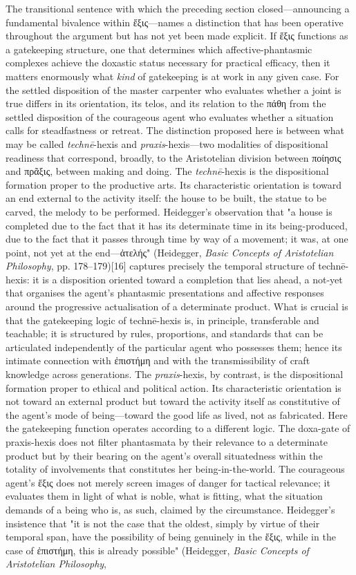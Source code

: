 \documentclass{article}
\begin{document}
The transitional sentence with which the preceding section closed—announcing a fundamental bivalence within ἕξις—names a distinction that has been operative throughout the argument but has not yet been made explicit. If ἕξις functions as a gatekeeping structure, one that determines which affective-phantasmic complexes achieve the doxastic status necessary for practical efficacy, then it matters enormously what \textit{kind} of gatekeeping is at work in any given case. For the settled disposition of the master carpenter who evaluates whether a joint is true differs in its orientation, its telos, and its relation to the πάθη from the settled disposition of the courageous agent who evaluates whether a situation calls for steadfastness or retreat. The distinction proposed here is between what may be called \textit{technē}-hexis and \textit{praxis}-hexis—two modalities of dispositional readiness that correspond, broadly, to the Aristotelian division between ποίησις and πρᾶξις, between making and doing. The \textit{technē}-hexis is the dispositional formation proper to the productive arts. Its characteristic orientation is toward an end external to the activity itself: the house to be built, the statue to be carved, the melody to be performed. Heidegger's observation that "a house is completed due to the fact that it has its determinate time in its being-produced, due to the fact that it passes through time by way of a movement; it was, at one point, not yet at the end—ἀτελής" (Heidegger, \textit{Basic Concepts of Aristotelian Philosophy}, pp. 178–179)[16] captures precisely the temporal structure of technē-hexis: it is a disposition oriented toward a completion that lies ahead, a not-yet that organises the agent's phantasmic presentations and affective responses around the progressive actualisation of a determinate product. What is crucial is that the gatekeeping logic of technē-hexis is, in principle, transferable and teachable; it is structured by rules, proportions, and standards that can be articulated independently of the particular agent who possesses them; hence its intimate connection with ἐπιστήμη and with the transmissibility of craft knowledge across generations. The \textit{praxis}-hexis, by contrast, is the dispositional formation proper to ethical and political action. Its characteristic orientation is not toward an external product but toward the activity itself as constitutive of the agent's mode of being—toward the good life as lived, not as fabricated. Here the gatekeeping function operates according to a different logic. The doxa-gate of praxis-hexis does not filter phantasmata by their relevance to a determinate product but by their bearing on the agent's overall situatedness within the totality of involvements that constitutes her being-in-the-world. The courageous agent's ἕξις does not merely screen images of danger for tactical relevance; it evaluates them in light of what is noble, what is fitting, what the situation demands of a being who is, as such, claimed by the circumstance. Heidegger's insistence that "it is not the case that the oldest, simply by virtue of their temporal span, have the possibility of being genuinely in the ἕξις, while in the case of ἐπιστήμη, this is already possible" (Heidegger, \textit{Basic Concepts of Aristotelian Philosophy}, 
\end{document}
